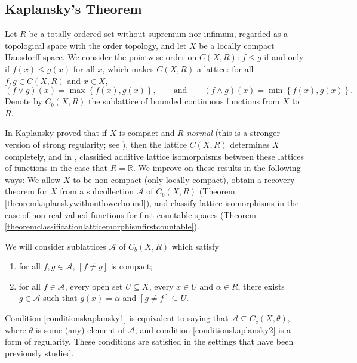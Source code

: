 \documentclass[letter,11pt]{amsart}
\theoremstyle{plain}		\newtheorem{theorem}[generalnumbering]{Theorem}
\theoremstyle{plain}		\newtheorem{corollary}[generalnumbering]{Corollary}
\theoremstyle{definition}		\newtheorem{definition}[generalnumbering]{Definition}
\theoremstyle{definition}		\newtheorem{example}[generalnumbering]{Example}
\theoremstyle{plain}		\newtheorem{proposition}[generalnumbering]{Proposition}
\theoremstyle{plain}		\newtheorem{lemma}[generalnumbering]{Lemma}
\theoremstyle{plain}    \newtheorem{plainstyle}[generalnumbering]{\namefordifferentenvironment}
\theoremstyle{plain}    \newtheorem*{plainstyle*}{\namefordifferentenvironment}
\theoremstyle{definition}    \newtheorem{definitionstyle}[generalnumbering]{\namefordifferentenvironment}
\theoremstyle{definition}    \newtheorem*{definitionstyle*}{\namefordifferentenvironment}
\begin{document}
\subsection{Kaplansky's Theorem}\label{subsectionkaplansky}

Let $R$ be a totally ordered set without supremum nor infimum, regarded as a topological space with the order topology, and let $X$ be a locally compact Hausdorff space. We consider the pointwise order on $C(X,R)$: $f\leq g$ if and only if $f(x)\leq g(x)$ for all $x$, which makes $C(X,R)$ a lattice: for all $f,g\in C(X,R)$ and $x\in X$,
\[(f\lor g)(x)=\max\left\{f(x),g(x)\right\},\qquad\text{and}\qquad(f\land g)(x)=\min\left\{f(x),g(x)\right\}.\]
Denote by $C_b(X,R)$ the sublattice of bounded continuous functions from $X$ to $R$.

In \cite{MR0020715} Kaplansky proved that if $X$ is compact and \emph{$R$-normal} (this is a stronger version of strong regularity; see \cite[p.\ 618]{MR0020715}), then the lattice $C(X,R)$ determines $X$ completely, and in \cite{MR0026240}, classified additive lattice isomorphisms between these lattices of functions in the case that $R=\mathbb{R}$. We improve on these results in the following ways: We allow $X$ to be non-compact (only locally compact), obtain a recovery theorem for $X$ from a subcollection $\mathcal{A}$ of $C_b(X,R)$ (Theorem \ref{theoremkaplanskywithoutlowerbound}), and classify lattice isomorphisms in the case of non-real-valued functions for first-countable spaces (Theorem \ref{theoremclassificationlatticemorphismfirstcountable}).

We will consider sublattices $\mathcal{A}$ of $C_b(X,R)$ which satisfy
\begin{enumerate}[label=(L\arabic*)]
	\item\label{conditionskaplansky1} for all $f,g\in\mathcal{A}$, $\overline{[f\neq g]}$ is compact;
	\item\label{conditionskaplansky2} for all $f\in\mathcal{A}$, every open set $U\subseteq X$, every $x\in U$ and $\alpha\in R$, there exists $g\in\mathcal{A}$ such that $g(x)=\alpha$ and $[g\neq f]\subseteq U$.
\end{enumerate}

Condition \ref{conditionskaplansky1} is equivalent to saying that $\mathcal{A}\subseteq C_c(X,\theta)$, where $\theta$ is some (any) element of $\mathcal{A}$, and condition \ref{conditionskaplansky2} is a form of regularity. These conditions are satisfied in the settings that have been previously studied.
\end{document}
